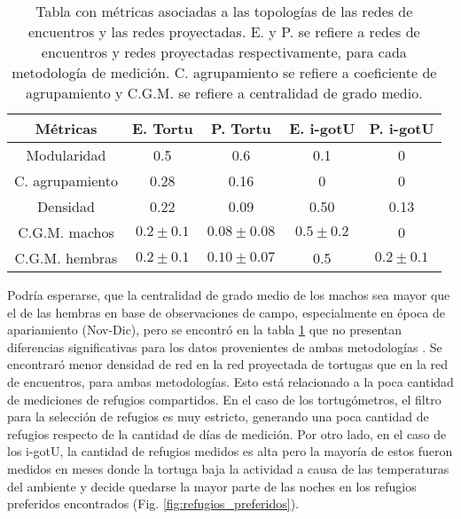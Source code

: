 \begin{table}[ht]
    \centering
    \begin{tabular}{|c|c|c|c|c|}
    \hline
    Métricas          & E. Tortu   & P. Tortu      & E. i-gotU   & P. i-gotU    \\ \hline
    Modularidad       & 0.5         & 0.6           & 0.1        & 0            \\ \hline
    C. agrupamiento & 0.28        & 0.16          & 0           & 0            \\ \hline
    Densidad          & 0.22        & 0.09          & 0.50         & 0.13          \\ \hline
    C.G.M. machos     & $0.2\pm0.1$ & $0.08\pm0.08$ & $0.5\pm0.2$ & 0            \\ \hline
    C.G.M. hembras    & $0.2\pm0.1$ & $0.10\pm0.07$ & 0.5         & $0.2\pm0.1 $ \\ \hline
    \end{tabular}
    \caption[Tabla con métricas asociadas a las tipologías de las redes de encuentros y las redes proyectadas.]{Tabla con métricas asociadas a las topologías de las redes de encuentros y las redes proyectadas. E. y P. se refiere a redes de encuentros y redes proyectadas respectivamente, para cada metodología de medición. C. agrupamiento se refiere a coeficiente de agrupamiento y C.G.M. se refiere a centralidad de grado medio.}
    \label{tab:metricas_topologia_redes}
\end{table}
Podría esperarse, que la centralidad de grado medio de los machos sea mayor que el de las hembras en base de observaciones de campo, especialmente en época de apariamiento (Nov-Dic), pero se encontró en la tabla \ref{tab:metricas_topologia_redes} que no presentan diferencias significativas para los datos provenientes de ambas metodologías \cite{Erika}. Se encontraró menor densidad de red en la red proyectada de tortugas que en la red de encuentros, para ambas metodologías. Esto está relacionado a la poca cantidad de mediciones de refugios compartidos. En el caso de los tortugómetros, el filtro para la selección de refugios es muy estricto, generando una poca cantidad de refugios respecto de la cantidad de días de medición. Por otro lado, en el caso de los i-gotU, la cantidad de refugios medidos es alta pero la mayoría de estos fueron medidos en meses donde la tortuga baja la actividad a causa de las temperaturas del ambiente y decide quedarse la mayor parte de las noches en los refugios preferidos encontrados (Fig. \ref{fig:refugios_preferidos}).
 
